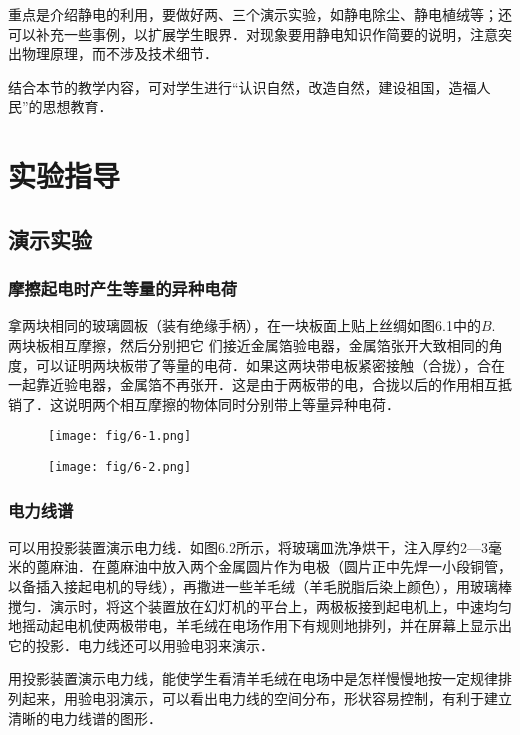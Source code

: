 重点是介绍静电的利用，要做好两、三个演示实验，如静电除尘、静电植绒等；还可以补充一些事例，以扩展学生眼界．对现象要用静电知识作简要的说明，注意突出物理原理，而不涉及技术细节．

结合本节的教学内容，可对学生进行“认识自然，改造自然，建设祖国，造福人民”的思想教育．

\section{实验指导}
\subsection{演示实验}
\subsubsection{摩擦起电时产生等量的异种电荷}

拿两块相同的玻璃圆板（装有绝缘手柄），在一块板面上贴上丝绸如图6.1中的$B$. 两块板相互摩擦，然后分别把它
们接近金属箔验电器，金属箔张开大致相同的角度，可以证明两块板带了等量的电荷．如果这两块带电板紧密接触（合拢），合在一起靠近验电器，金属箔不再张开．这是由于两板带的电，合拢以后的作用相互抵销了．这说明两个相互摩擦的物体同时分别带上等量异种电荷．
\begin{figure}[htp]\centering
    \begin{minipage}[t]{0.48\textwidth}
    \centering
    \texttt{[image: fig/6-1.png]}
    \caption{}
    \end{minipage}
    \begin{minipage}[t]{0.48\textwidth}
    \centering
    \texttt{[image: fig/6-2.png]}
    \caption{}
    \end{minipage}
    \end{figure}


\subsubsection{电力线谱}

可以用投影装置演示电力线．如图6.2所示，将玻璃皿洗净烘干，注入厚约2—3毫米的蓖麻油．在蓖麻油中放入两个金属圆片作为电极（圆片正中先焊一小段铜管，以备插入接起电机的导线），再撒进一些羊毛绒（羊毛脱脂后染上颜色），用玻璃棒搅匀．演示时，将这个装置放在幻灯机的平台上，两极板接到起电机上，中速均匀地摇动起电机使两极带电，羊毛绒在电场作用下有规则地排列，并在屏幕上显示出它的投影．电力线还可以用验电羽来演示．

用投影装置演示电力线，能使学生看清羊毛绒在电场中是怎样慢慢地按一定规律排列起来，用验电羽演示，可以看出电力线的空间分布，形状容易控制，有利于建立清晰的电力线谱的图形．

